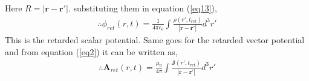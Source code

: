 \documentclass[11pt,a4paper]{article}
\begin{document}
Here $R = |\mathbf{r} - \mathbf{r'}|$. substituting them in equation (\ref{eq13}),
\begin{align}
    \therefore \boxed{\phi_{ret}(r,t) = \frac{1}{4\pi \epsilon_0} \int \frac{\rho (r',t_{ret})}{|\mathbf{r} - \mathbf{r'}|} d^3r'} \label{eq15}
\end{align}
This is the retarded scalar potential. Same goes for the retarded vector potential and from equation (\ref{eq2}) it can be written as,
\begin{align}
    \therefore \boxed{\mathbf{A}_{ret}(r,t) = \frac{\mu_0}{4\pi} \int \frac{\mathbf{J}(r',t_{ret})}{|\mathbf{r} - \mathbf{r'}|} d^3r'} \label{eq16}
\end{align}
\newpage
\end{document}
